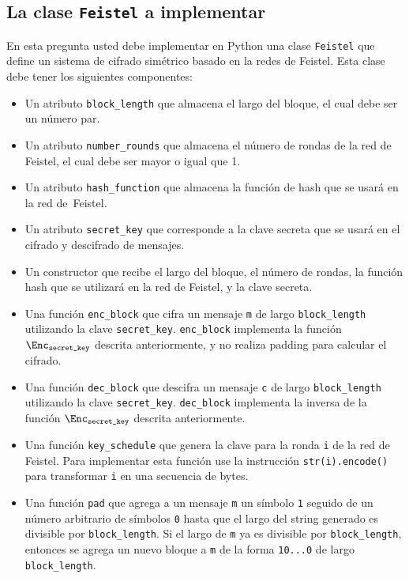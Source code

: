 \subsection*{La clase \texttt{Feistel} a implementar}
En esta pregunta usted debe implementar en Python una clase \texttt{Feistel} que define un sistema de cifrado simétrico basado en la redes de Feistel. Esta clase debe tener los siguientes componentes:
\begin{itemize}
\item Un atributo \texttt{block\_length} que almacena el largo del bloque, el cual debe ser un número par.

\item Un atributo \texttt{number\_rounds} que almacena el número de rondas de la red de Feistel, el cual debe ser mayor o igual que 1.

\item Un atributo \texttt{hash\_function} que almacena la función de hash que se usará en la red de~Feistel.

\item Un atributo \texttt{secret\_key} que corresponde a la clave secreta que se usará en el cifrado y descifrado de mensajes.

\item Un constructor que recibe el largo del bloque, el número de rondas, la función hash que se utilizará en la red de Feistel, y la clave secreta.

\item Una función \texttt{enc\_block} que cifra un mensaje \texttt{m} de largo \texttt{block\_length} utilizando la clave \texttt{secret\_key}. \texttt{enc\_block} implementa la función
  $\Enc_{\texttt{secret\_key}}$ descrita anteriormente, y no realiza padding para calcular el cifrado.

\item Una función \texttt{dec\_block} que descifra un mensaje \texttt{c} de largo \texttt{block\_length} utilizando la clave \texttt{secret\_key}. \texttt{dec\_block} implementa la
  inversa de la función $\Enc_{\texttt{secret\_key}}$ descrita anteriormente.

\item Una función \texttt{key\_schedule} que genera la clave para la ronda \texttt{i} de la red de Feistel. Para implementar esta función use la instrucción
\texttt{str(i).encode()} para transformar \texttt{i} en una secuencia de bytes.

\item Una función \texttt{pad} que agrega a un mensaje \texttt{m} un símbolo \texttt{1} seguido de un número arbitrario de símbolos \texttt{0} hasta que el largo del string generado es divisible por \texttt{block\_length}. Si el largo de \texttt{m} ya es divisible por \texttt{block\_length}, entonces se agrega un nuevo bloque a \texttt{m} de la forma \texttt{10...0} de largo \texttt{block\_length}.


\end{itemize}
